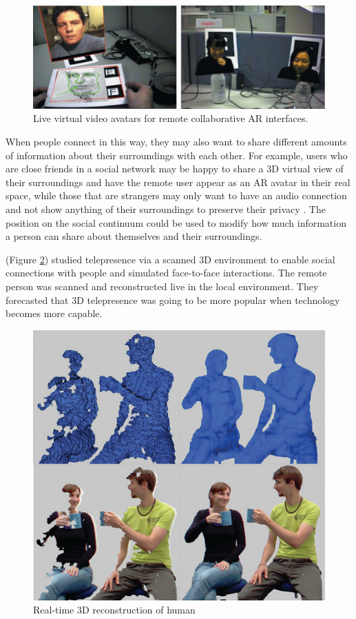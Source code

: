 \begin{figure}
    \centering
    \includegraphics[width=\linewidth]{images/Billinghurst2002.PNG}
    \caption{Live virtual video avatars for remote collaborative AR interfaces. \cite{Billinghurst2002}}
    \label{fig:Billinghurst2002}
\end{figure}

When people connect in this way, they may also want to share different amounts of information about their surroundings with each other. For example, users who are close friends in a social network may be happy to share a 3D virtual view of their surroundings and have the remote user appear as an AR avatar in their real space, while those that are strangers may only want to have an audio connection and not show anything of their surroundings to preserve their privacy \cite{Oetzel2011}. The position on the social continuum could be used to modify how much information a person can share about themselves and their surroundings.

\cite{Fuchs2014} (Figure \ref{fig:Fuchs2014}) studied telepresence via a scanned 3D environment to enable social connections with people and simulated face-to-face interactions. The remote person was scanned and reconstructed live in the local environment. They forecasted that 3D telepresence was going to be more popular when technology becomes more capable.

\begin{figure}
    \centering
    \includegraphics[width=.8\linewidth]{images/Fuchs2014.PNG}
    \caption{Real-time 3D reconstruction of human \cite{Fuchs2014}}
    \label{fig:Fuchs2014}
\end{figure}

